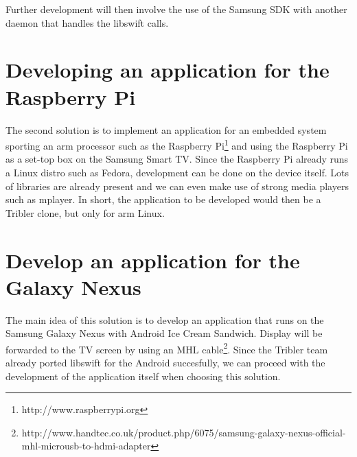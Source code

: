 Further development will then involve the use of the Samsung SDK with another daemon that handles the libswift calls.

\section*{Developing an application for the Raspberry Pi}
The second solution is to implement an application for an embedded system sporting an arm processor such as the Raspberry Pi\footnote{http://www.raspberrypi.org}
and using the Raspberry Pi as a set-top box on the Samsung Smart TV.
Since the Raspberry Pi already runs a Linux distro such as Fedora, development can be done on the device itself.
Lots of libraries are already present and we can even make use of strong media players such as mplayer.
In short, the application to be developed would then be a Tribler clone, but only for arm Linux.

\section*{Develop an application for the Galaxy Nexus}
The main idea of this solution is to develop an application that runs on the Samsung Galaxy Nexus with Android Ice Cream Sandwich.
Display will be forwarded to the TV screen by using an MHL cable\footnote{http://www.handtec.co.uk/product.php/6075/samsung-galaxy-nexus-official-mhl-microusb-to-hdmi-adapter}.
Since the Tribler team already ported libswift for the Android succesfully,
we can proceed with the development of the application itself when choosing this solution.
